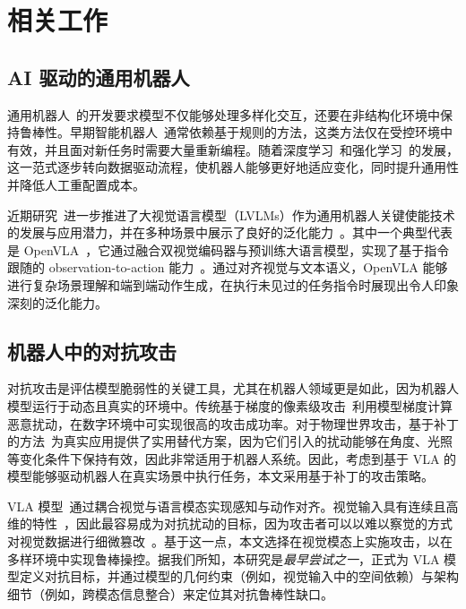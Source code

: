 \section{相关工作}

\subsection{AI 驱动的通用机器人}
通用机器人~\cite{Nilsson1973, BillardscienceTrends, Kroemer2021ReviewRobotLearning, Ingrand2017ReviewDeliberation, Cui2021ScienceRobotic}的开发要求模型不仅能够处理多样化交互，还要在非结构化环境中保持鲁棒性。早期智能机器人~\cite{Murray1994mathematical, Mason2001Mechanics, Mason2018Toward, moudgal1994rule, zhu2021rule}通常依赖基于规则的方法，这类方法仅在受控环境中有效，并且面对新任务时需要大量重新编程。随着深度学习~\cite{Levine2018CNNHandEye, Pinto2016Supersizing, Finn2017MetaLearning, JamesBD18TaskEmbedded}和强化学习~\cite{tang2024deep, wang2024research, al2024reinforcement}的发展，这一范式逐步转向数据驱动流程，使机器人能够更好地适应变化，同时提升通用性并降低人工重配置成本。

近期研究~\cite{Brohan2023rt1, MeesHB2022What, Pong2020Skew}进一步推进了大视觉语言模型（LVLMs）作为通用机器人关键使能技术的发展与应用潜力，并在多种场景中展示了良好的泛化能力~\cite{Brianna2023RT2, Jiang2022VIMA, Octo2024Octo, huang2023embodied, li2023vision, cui2024collaborative}。其中一个典型代表是 OpenVLA~\cite{kim24openvla}，它通过融合双视觉编码器与预训练大语言模型，实现了基于指令跟随的 observation-to-action 能力~\cite{liu2024improved, liu2024visual, karamcheti2024prismatic, chen2023pali, zhao2023svit, wang2024mmpt}。通过对齐视觉与文本语义，OpenVLA 能够进行复杂场景理解和端到端动作生成，在执行未见过的任务指令时展现出令人印象深刻的泛化能力。

\subsection{机器人中的对抗攻击}\label{subsec:lr:ad_attack}
对抗攻击是评估模型脆弱性的关键工具，尤其在机器人领域更是如此，因为机器人模型运行于动态且真实的环境中。传统基于梯度的像素级攻击~\cite{Goodfellow2015FGSM,Madry2018twords,Du2022Physical,Wang2019advPattern,Liu2019Perceptualpatch,Su2019OnePixel}利用模型梯度计算恶意扰动，在数字环境中可实现很高的攻击成功率。对于物理世界攻击，基于补丁的方法~\cite{brown2018adversarialpatch, Sharif2016advglass, Xu2020AdvTShirt, AthalyeEOT2018, wu2024adversarial}为真实应用提供了实用替代方案，因为它们引入的扰动能够在角度、光照等变化条件下保持有效，因此非常适用于机器人系统。因此，考虑到基于 VLA 的模型能够驱动机器人在真实场景中执行任务，本文采用基于补丁的攻击策略。

VLA 模型~\cite{Octo2024Octo,Huang2023VoxPoser, chiang2024mobility}通过耦合视觉与语言模态实现感知与动作对齐。视觉输入具有连续且高维的特性~\cite{Szegedy2014Intriguing,Madry2018twords, QiHP0WM24Visual}，因此最容易成为对抗扰动的目标，因为攻击者可以以难以察觉的方式对视觉数据进行细微篡改~\cite{Carlini017Bypassing,AthalyeC018Obfuscated,Tramer22Detecting}。基于这一点，本文选择在视觉模态上实施攻击，以在多样环境中实现鲁棒操控。据我们所知，本研究是\textit{最早尝试之一}，正式为 VLA 模型定义对抗目标，并通过模型的几何约束（例如，视觉输入中的空间依赖）与架构细节（例如，跨模态信息整合）来定位其对抗鲁棒性缺口。
